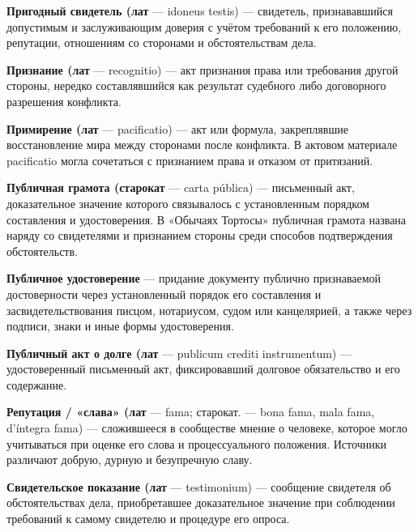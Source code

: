 \noindent\textbf{Пригодный свидетель (лат} --- idoneus testis) --- свидетель, признававшийся допустимым и заслуживающим доверия с учётом требований к его положению, репутации, отношениям со сторонами и обстоятельствам дела.
\par\medskip

\noindent\textbf{Признание (лат} --- recognitio) --- акт признания права или требования другой стороны, нередко составлявшийся как результат судебного либо договорного разрешения конфликта.
\par\medskip

\noindent\textbf{Примирение (лат} --- pacificatio) --- акт или формула, закреплявшие восстановление мира между сторонами после конфликта. В актовом материале pacificatio могла сочетаться с признанием права и отказом от притязаний.
\par\medskip

\noindent\textbf{Публичная грамота (старокат} --- carta pública) --- письменный акт, доказательное значение которого связывалось с установленным порядком составления и удостоверения. В «Обычаях Тортосы» публичная грамота названа наряду со свидетелями и признанием стороны среди способов подтверждения обстоятельств.
\par\medskip

\noindent\textbf{Публичное удостоверение} --- придание документу публично признаваемой достоверности через установленный порядок его составления и засвидетельствования писцом, нотариусом, судом или канцелярией, а также через подписи, знаки и иные формы удостоверения.
\par\medskip

\noindent\textbf{Публичный акт о долге (лат} --- publicum crediti instrumentum) --- удостоверенный письменный акт, фиксировавший долговое обязательство и его содержание.
\par\medskip

\noindent\textbf{Репутация / «слава» (лат} --- fama; старокат. --- bona fama, mala fama, d’íntegra fama) --- сложившееся в сообществе мнение о человеке, которое могло учитываться при оценке его слова и процессуального положения. Источники различают добрую, дурную и безупречную славу.
\par\medskip

\noindent\textbf{Свидетельское показание (лат} --- testimonium) --- сообщение свидетеля об обстоятельствах дела, приобретавшее доказательное значение при соблюдении требований к самому свидетелю и процедуре его опроса.
\par\medskip

